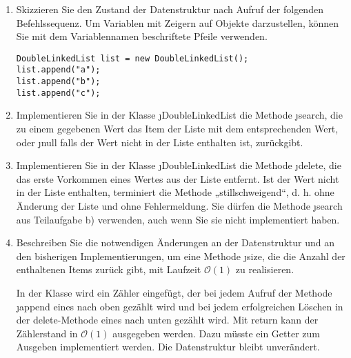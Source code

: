 \documentclass{lehramt-informatik-aufgabe}
\begin{document}
\begin{enumerate}


\item Skizzieren Sie den Zustand der Datenstruktur nach Aufruf der
folgenden Befehlssequenz. Um Variablen mit Zeigern auf Objekte
darzustellen, können Sie mit dem Variablennamen beschriftete Pfeile
verwenden.

\begin{verbatim}
DoubleLinkedList list = new DoubleLinkedList();
list.append("a");
list.append("b");
list.append("c");
\end{verbatim}

%

\item Implementieren Sie in der Klasse \j{DoubleLinkedList} die Methode
\j{search}, die zu einem gegebenen Wert das Item der Liste mit dem
entsprechenden Wert, oder \j{null} falls der Wert nicht in der Liste
enthalten ist, zurückgibt.

\begin{liAntwort}
\end{liAntwort}

%

\item Implementieren Sie in der Klasse \j{DoubleLinkedList} die Methode
\j{delete}, die das erste Vorkommen eines Wertes aus der Liste entfernt.
Ist der Wert nicht in der Liste enthalten, terminiert die Methode
„stillschweigend“, d. h. ohne Änderung der Liste und ohne Fehlermeldung.
Sie dürfen die Methode \j{search} aus Teilaufgabe b) verwenden, auch
wenn Sie sie nicht implementiert haben.

\begin{liAntwort}
\end{liAntwort}

%

\item Beschreiben Sie die notwendigen Änderungen an der Datenstruktur
und an den bisherigen Implementierungen, um eine Methode \j{size}, die
die Anzahl der enthaltenen Items zurück gibt, mit Laufzeit
$\mathcal{O}(1)$ zu realisieren.

\begin{liAntwort}
In der Klasse wird ein Zähler eingefügt, der bei jedem Aufruf der
Methode \j{append} eines nach oben gezählt wird und bei jedem
erfolgreichen Löschen in der delete-Methode eines nach unten gezählt
wird. Mit return kann der Zählerstand in $\mathcal{O}(1)$ ausgegeben
werden. Dazu müsste ein Getter zum Ausgeben implementiert werden. Die
Datenstruktur bleibt unverändert.
\end{liAntwort}

\end{enumerate}
\end{document}

